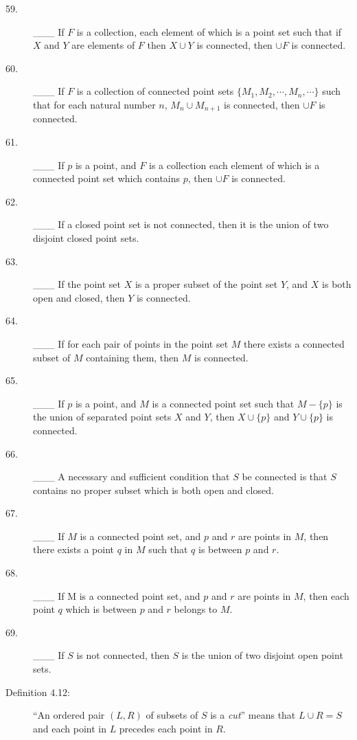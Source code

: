 \documentclass{book}
\begin{document}
\begin{description}
\item[59.] \_\_\_ If $F$ is a collection, each element of which is a point set such that if $X$ and $Y$ are elements of $F$ then $X \cup Y$ is connected, then $\cup F$ is connected.

\item[60.] \_\_\_ If $F$ is a collection of connected point sets $\{ M_{1}, M_{2}, \cdots, M_{n}, \cdots \}$ such that for each natural number $n$, $M_{n} \cup M_{n+1}$ is connected, then $\cup F$ is connected.

\item[61.] \_\_\_ If $p$ is a point, and $F$ is a collection each element of which is a connected point set which contains $p$, then $\cup F$ is connected.

\item[62.] \_\_\_ If a closed point set is not connected, then it is the union of two disjoint closed point sets.

\item[63.] \_\_\_ If the point set $X$ is a proper subset of the point set $Y$, and $X$ is both open and closed, then $Y$ is connected.

\item[64.] \_\_\_ If for each pair of points in the point set $M$ there exists a connected subset of $M$ containing them, then $M$ is connected.

\item[65.] \_\_\_ If $p$ is a point, and $M$ is a connected point set such that $M - \{ p \}$ is the union of separated point sets $X$ and $Y$, then $X \cup \{ p \}$ and $Y \cup \{ p \}$ is connected.

\item[66.] \_\_\_ A necessary and sufficient condition that $S$ be connected is that $S$ contains no proper subset which is both open and closed.

\item[67.] \_\_\_ If $M$ is a connected point set, and $p$ and $r$ are points in $M$, then there exists a point $q$ in $M$ such that $q$ is between $p$ and $r$.

\item[68.] \_\_\_ If M is a connected point set, and $p$ and $r$ are points in $M$, then each point $q$ which is between $p$ and $r$ belongs to $M$.

\item[69.] \_\_\_ If $S$ is not connected, then $S$ is the union of two disjoint open point sets.

\item[Definition 4.12:] ``An ordered pair $(L,R)$ of subsets of $S$ is a \emph{cut}'' means that $L \cup R = S$ and each point in $L$ precedes each point in $R$.


\end{description}
\end{document}
